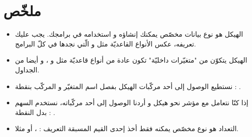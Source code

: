 \section*{ملخّص}

\begin{itemize}
  \item الهيكل هو نوع بيانات مخصّص يمكنك إنشاؤه و استخدامه في برامجك. يجب عليك تعريفه، عكس الأنواع القاعديّة مثل
و
الّتي نجدها في كلّ البرامج.
  \item الهيكل يتكوّن من "متغيّرات داخليّة" تكون عادة من أنواع قاعديّة مثل
و
،
و أيضا من الجداول.
  \item نستطيع الوصول إلى أحد مركّبات الهيكل بفصل اسم المتغيّر و المركّب بنقطة :
.
  \item إذا كنّا نتعامل مع مؤشر نحو هيكل و أردنا الوصول إلى أحد مركّباته، نستخدم السهم بدل النقطة :
.
  \item التعداد هو نوع مخصّص يمكنه فقط أخذ إحدى القيم المسبقة التعريف :
،
أو
مثلا.
\end{itemize}

